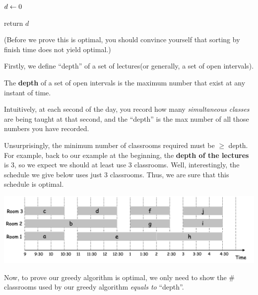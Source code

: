 \begin{spacing}{1.3}
\begin{algorithm*}[htbp]
        $d\leftarrow 0$\quad {}

        return $d$
    \end{algorithm*}

    (Before we prove this is optimal, you should convince yourself that sorting by 
    finish time does not yield optimal.)

    Firstly, we define ``depth'' of a set of lectures(or generally, a set of open intervals).

    \begin{definition}
        The {\bf depth} of a set of open intervals is the maximum number that 
        exist at any instant of time.
    \end{definition}
    Intuitively, at each second of the day, you record how many {\it simultaneous classes}
    are being taught at that second, and the ``depth'' is the max number of all 
    those numbers you have recorded.

    Unsurprisingly, the minimum number of classrooms required must be $\ge $ depth.
    For example, back to our example at the beginning, the {\bf depth of the lectures} 
    is 3, so we expect we should at least use 3 classrooms. Well, interestingly, 
    the schedule we give below uses just 3 classrooms. Thus, we are sure that this schedule
    is optimal.
    \begin{center}
        \includegraphics[scale=0.5]{images/07-interval-part-demo.png}
    \end{center}

    Now, to prove our greedy algorithm is optimal, we only need to show 
    the \# classrooms used by our greedy algorithm {\it equals to} ``depth''.


\end{spacing}
